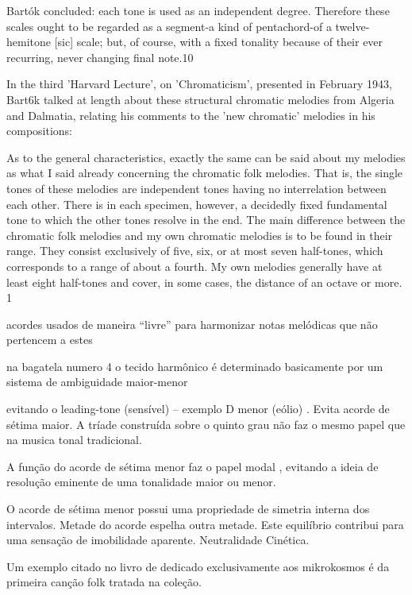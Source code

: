 \documentclass[
	12pt,				%
	openright,			%
	twoside,			%
	a4paper,			%
	english,			%
	french,				%
	spanish,			%
	brazil				%
	]{abntex2}
\begin{document}
Bartók concluded:
each tone is used as an independent degree. Therefore these scales ought to be regarded as a segment-a kind of
pentachord-of a twelve-hemitone [sic] scale; but, of course, with a fixed tonality because of their ever
recurring, never changing final note.10

In the third 'Harvard Lecture', on 'Chromaticism', presented in February 1943,
Bart6k talked at length about these structural chromatic melodies from Algeria and
Dalmatia, relating his comments to the 'new chromatic' melodies in his compositions:

As to the general characteristics, exactly the same can be said about my melodies as what I said already
concerning the chromatic folk melodies. That is, the single tones of these melodies are independent tones
having no interrelation between each other. There is in each specimen, however, a decidedly fixed
fundamental tone to which the other tones resolve in the end. The main difference between the chromatic folk
melodies and my own chromatic melodies is to be found in their range. They consist exclusively of five, six, or
at most seven half-tones, which corresponds to a range of about a fourth. My own melodies generally have at
least eight half-tones and cover, in some cases, the distance of an octave or more. 1
\cite[ p.6]{gillies1983bartok}










acordes usados de maneira “livre” para harmonizar notas melódicas que não pertencem a estes

na bagatela numero 4 o tecido harmônico é determinado basicamente por um sistema de ambiguidade maior-menor 

evitando o leading-tone (sensível) – exemplo D menor (eólio) . Evita acorde de sétima maior. 
A tríade construída sobre o quinto grau não faz o mesmo papel que na musica tonal tradicional.

A função do acorde de sétima menor faz o papel modal , evitando a ideia de resolução eminente de uma tonalidade maior ou menor.

O acorde de sétima menor possui uma propriedade de simetria interna dos intervalos. Metade do acorde espelha outra metade. Este equilíbrio contribui para uma sensação de imobilidade aparente. Neutralidade Cinética.



Um exemplo citado no livro de   dedicado exclusivamente aos mikrokosmos é da primeira canção folk tratada na coleção.
\end{document}
